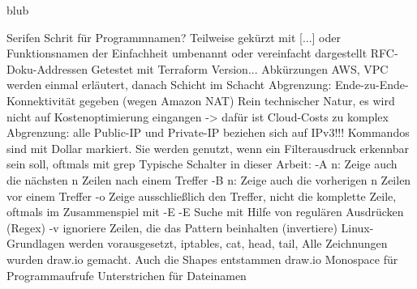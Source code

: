 blub

\ifFalse
Serifen Schrit für Programmnamen?
Teilweise gekürzt mit [...] oder Funktionsnamen der Einfachheit umbenannt oder vereinfacht dargestellt
RFC-Doku-Addressen
Getestet mit Terraform Version...
Abkürzungen AWS, VPC werden einmal erläutert, danach Schicht im Schacht
Abgrenzung: Ende-zu-Ende-Konnektivität gegeben (wegen Amazon NAT)
Rein technischer Natur, es wird nicht auf Kostenoptimierung eingangen -> dafür ist Cloud-Costs zu komplex
Abgrenzung: alle Public-IP und Private-IP beziehen sich auf IPv3!!!
Kommandos sind mit Dollar markiert. Sie werden genutzt, wenn ein Filterausdruck erkennbar sein soll, oftmals mit grep
Typische Schalter in dieser Arbeit:
-A n: Zeige auch die nächsten n Zeilen nach einem Treffer
-B n: Zeige auch die vorherigen n Zeilen vor einem Treffer
-o Zeige ausschließlich den Treffer, nicht die komplette Zeile, oftmals im Zusammenspiel mit -E
-E Suche mit Hilfe von regulären Ausdrücken (Regex)
-v ignoriere Zeilen, die das Pattern beinhalten (invertiere)
Linux-Grundlagen werden vorausgesetzt, iptables, cat, head, tail, 
Alle Zeichnungen wurden draw.io gemacht. Auch die Shapes entstammen draw.io
Monospace für Programmaufrufe
Unterstrichen für Dateinamen
\fi